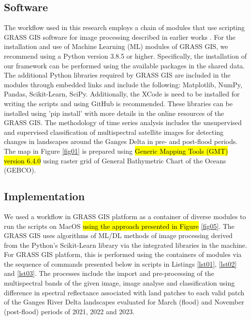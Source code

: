 \documentclass[water,article,submit,pdftex,moreauthors]{Definitions/mdpi}
\begin{document}
\subsection{Software}
The workflow used in this research employs a chain of modules that use scripting GRASS GIS software \cite{GRASS_GIS_software} for image processing described in earlier works \cite{Lemenkova202323,technologies11020046}. For the installation and use of Machine Learning (ML) modules of GRASS GIS, we recommend using a Python version 3.8.5 or higher. Specifically, the installation of our framework can be performed using the available packages in the shared data. The additional Python libraries required by GRASS GIS are included in the modules through embedded links and include the following: Matplotlib, NumPy, Pandas, Scikit-Learn, SciPy. Additionally, the XCode is need to be installed for writing the scripts and using GitHub is recommended. These libraries can be installed using 'pip install' with more details in the online resources of the GRASS GIS. The methodology of time series analysis includes the unsupervised and supervised classification of multispectral satellite images for detecting changes in landscapes around the Ganges Delta in pre- and post-flood periods. The map in Figure \ref{fig01} is prepared using \hl{Generic Mapping Tools (GMT) version 6.4.0} \cite{Wessel,WesselSmith} using raster grid of General Bathymetric Chart of the Oceans (GEBCO). 

\subsection{Implementation}
We used a workflow in GRASS GIS platform as a container of diverse modules to run the scripts on MacOS \hl{using the approach presented in Figure} \ref{fig05}. The GRASS GIS uses algorithms of ML/DL methods of image processing derived from the Python's Scikit-Learn library \cite{pedregosa2011scikit} via the integrated libraries in the machine. For GRASS GIS platform, this is performed using the containers of modules via the sequence of commands presented below in scripts in Listings \ref{lst01}, \ref{lst02} and \ref{lst03}. The processes include the import and pre-processing of the multispectral bands of the given image, image analyse and classification using difference in spectral reflectance associated with land patches to each valid patch of the Ganges River Delta landscapes evaluated for March (flood) and November (post-flood) periods of 2021, 2022 and 2023.
\end{document}

